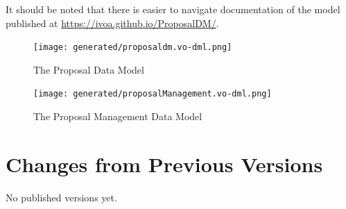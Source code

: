 \documentclass[10pt,a4paper]{ivoa}
\begin{document}
It should be noted that there is easier to navigate documentation of the model published at \url{https://ivoa.github.io/ProposalDM/}.



\begin{figure}
    \centering
\texttt{[image: generated/proposaldm.vo-dml.png]}
\caption{The Proposal Data Model}
\label{fig:propdm}
\end{figure}


\begin{figure}
    \centering
    \texttt{[image: generated/proposalManagement.vo-dml.png]}
    \caption{The Proposal Management Data Model}
    \label{fig:propmdm}
\end{figure}



\appendix
\section{Changes from Previous Versions}

No published versions yet.



\end{document}
